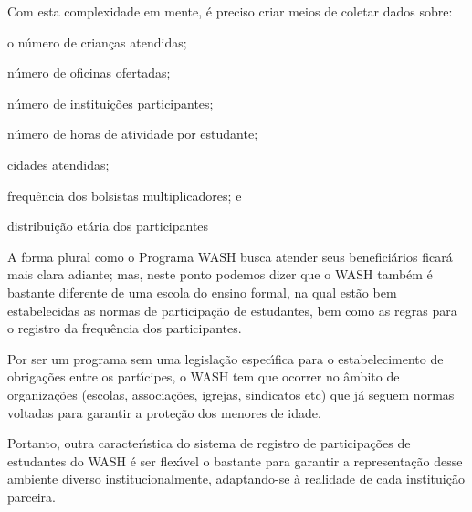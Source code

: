 \documentclass[
12pt,		%
openright,	%
twoside,  %
a4paper,			%
chapter=TITLE,		%
english,			%
french,				%
spanish,			%
brazil				%
]{USPSC-classe/USPSC}
\begin{document}
Com esta complexidade em mente, \'e preciso criar meios de coletar dados sobre:










\begin{alineas}
\item o n\'umero de crian\c{c}as atendidas;
\item n\'umero de oficinas ofertadas;
\item n\'umero de institui\c{c}\~oes participantes;
\item n\'umero de horas de atividade por estudante;
\item cidades atendidas;
\item frequ\^encia dos bolsistas multiplicadores; e
\item distribui\c{c}\~ao et\'aria dos participantes
\end{alineas}











A forma plural como o Programa WASH busca atender seus benefici\'arios ficar\'a mais clara adiante; mas, neste ponto podemos dizer que o WASH tamb\'em \'e bastante diferente de uma escola do ensino formal, na qual est\~ao bem estabelecidas as normas de participa\c{c}\~ao de estudantes, bem como as regras para o registro da frequ\^encia dos participantes.









Por ser um programa sem uma legisla\c{c}\~ao espec\'{\i}fica para o estabelecimento de obriga\c{c}\~oes entre os part\'{\i}cipes, o WASH tem que ocorrer no \^ambito de organiza\c{c}\~oes (escolas, associa\c{c}\~oes, igrejas, sindicatos etc) que j\'a seguem normas voltadas para garantir a prote\c{c}\~ao dos menores de idade.









Portanto, outra caracter\'{\i}stica do sistema de registro de participa\c{c}\~oes de estudantes do WASH \'e ser flex\'{\i}vel o bastante para garantir a representa\c{c}\~ao desse ambiente diverso institucionalmente, adaptando-se \`a realidade de cada institui\c{c}\~ao parceira.
\end{document}
